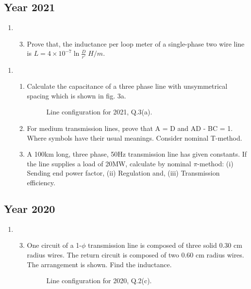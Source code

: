 \documentclass[12pt, a4paper]{article}
\begin{document}
	\subsection{Year 2021}
	\begin{enumerate}[label=\textbf{Q\arabic*.}, wide, labelindent=0pt, start=2]
		\item
		\begin{enumerate}[label=\textbf{(\alph*)}]
			\setcounter{enumii}{2} %
			\item Prove that, the inductance per loop meter of a single-phase two wire line is $L = 4 \times 10^{-7} \ln \frac{D}{r'} \; H/m$.
		\end{enumerate}
	\end{enumerate}
	\begin{enumerate}[label=\textbf{Q\arabic*.}, wide, labelindent=0pt, start=3]
		\item
		\begin{enumerate}[label=\textbf{(\alph*)}]
			\item Calculate the capacitance of a three phase line with unsymmetrical spacing which is shown in fig. 3a.
			\begin{figure}[h!]
				\centering
				\caption{Line configuration for 2021, Q.3(a).}
			\end{figure}
			\item For medium transmission lines, prove that A = D and AD - BC = 1. Where symbols have their usual meanings. Consider nominal T-method.
			\item A 100km long, three phase, 50Hz transmission line has given constants. If the line supplies a load of 20MW, calculate by nominal $\pi$-method: (i) Sending end power factor, (ii) Regulation and, (iii) Transmission efficiency.
		\end{enumerate}
	\end{enumerate}
	
	
	\subsection{Year 2020}
	\begin{enumerate}[label=\textbf{Q\arabic*.}, wide, labelindent=0pt, start=2]
		\item 
		\begin{enumerate}[label=\textbf{(\alph*)}]
			\setcounter{enumii}{2} %
			\item One circuit of a 1-$\phi$ transmission line is composed of three solid 0.30 cm radius wires. The return circuit is composed of two 0.60 cm radius wires. The arrangement is shown. Find the inductance.
			\begin{figure}[h!]
				\centering
				\caption{Line configuration for 2020, Q.2(c).}
			\end{figure}
		\end{enumerate}
	\end{enumerate}
	
\end{document}
